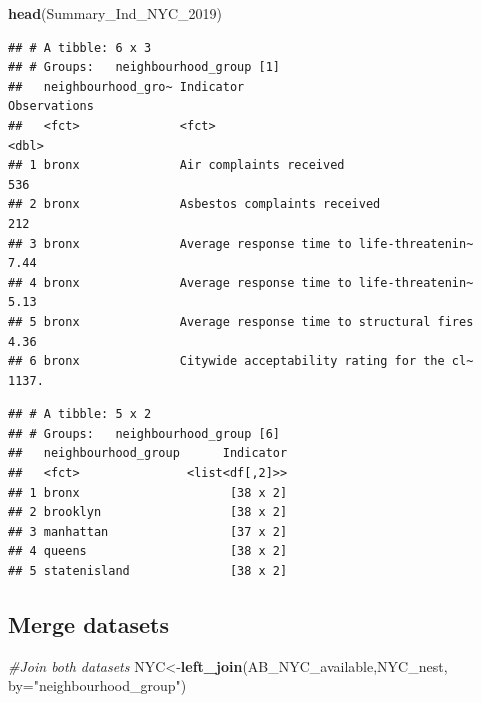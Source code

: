\documentclass[]{article}
\newenvironment{Shaded}{\begin{snugshade}}{\end{snugshade}}
\newcommand{\CommentTok}[1]{\textcolor[rgb]{0.56,0.35,0.01}{\textit{#1}}}
\newcommand{\DataTypeTok}[1]{\textcolor[rgb]{0.13,0.29,0.53}{#1}}
\newcommand{\DecValTok}[1]{\textcolor[rgb]{0.00,0.00,0.81}{#1}}
\newcommand{\KeywordTok}[1]{\textcolor[rgb]{0.13,0.29,0.53}{\textbf{#1}}}
\newcommand{\NormalTok}[1]{#1}
\newcommand{\OperatorTok}[1]{\textcolor[rgb]{0.81,0.36,0.00}{\textbf{#1}}}
\newcommand{\StringTok}[1]{\textcolor[rgb]{0.31,0.60,0.02}{#1}}
\begin{document}
\begin{Shaded}
\begin{Highlighting}[]
\KeywordTok{head}\NormalTok{(Summary_Ind_NYC_}\DecValTok{2019}\NormalTok{)}
\end{Highlighting}
\end{Shaded}

\begin{verbatim}
## # A tibble: 6 x 3
## # Groups:   neighbourhood_group [1]
##   neighbourhood_gro~ Indicator                                 Observations
##   <fct>              <fct>                                            <dbl>
## 1 bronx              Air complaints received                         536   
## 2 bronx              Asbestos complaints received                    212   
## 3 bronx              Average response time to life-threatenin~         7.44
## 4 bronx              Average response time to life-threatenin~         5.13
## 5 bronx              Average response time to structural fires         4.36
## 6 bronx              Citywide acceptability rating for the cl~      1137.
\end{verbatim}

\begin{Shaded}
\end{Shaded}

\begin{verbatim}
## # A tibble: 5 x 2
## # Groups:   neighbourhood_group [6]
##   neighbourhood_group      Indicator
##   <fct>               <list<df[,2]>>
## 1 bronx                     [38 x 2]
## 2 brooklyn                  [38 x 2]
## 3 manhattan                 [37 x 2]
## 4 queens                    [38 x 2]
## 5 statenisland              [38 x 2]
\end{verbatim}

\hypertarget{merge-datasets}{%
\subsection{Merge datasets}\label{merge-datasets}}

\begin{Shaded}
\begin{Highlighting}[]
\CommentTok{#Join both datasets}
\NormalTok{NYC<-}\KeywordTok{left_join}\NormalTok{(AB_NYC_available,NYC_nest, }\DataTypeTok{by=}\StringTok{"neighbourhood_group"}\NormalTok{)}
\end{Highlighting}
\end{Shaded}
\end{document}
